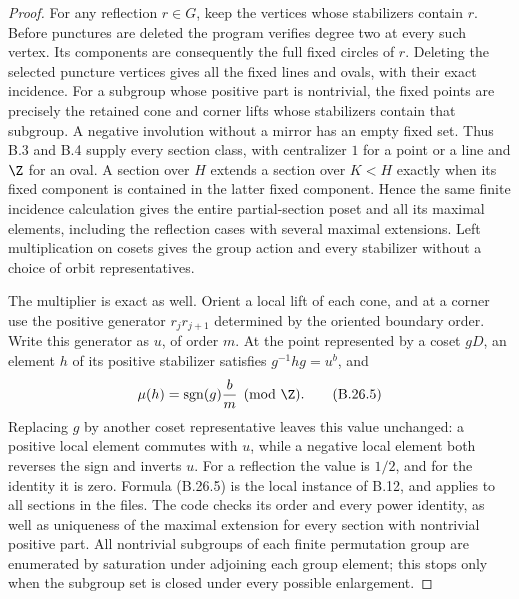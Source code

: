 \begin{proof}
For any reflection $r\in G$, keep the vertices whose stabilizers
contain $r$.  Before punctures are deleted the program verifies degree
two at every such vertex.  Its components are consequently the full
fixed circles of $r$.  Deleting the selected puncture vertices gives
all the fixed lines and ovals, with their exact incidence.  For a
subgroup whose positive part is nontrivial, the fixed points are
precisely the retained cone and corner lifts whose stabilizers contain
that subgroup.  A negative involution without a mirror has an empty
fixed set.  Thus B.3 and B.4 supply every section class, with centralizer
$1$ for a point or a line and $\Z$ for an oval.  A section over $H$
extends a section over $K<H$ exactly when its fixed component is
contained in the latter fixed component.  Hence the same finite
incidence calculation gives the entire partial-section poset and all
its maximal elements, including the reflection cases with several
maximal extensions.  Left multiplication on cosets gives the group
action and every stabilizer without a choice of orbit representatives.

The multiplier is exact as well.  Orient a local lift of each cone,
and at a corner use the positive generator $r_jr_{j+1}$ determined by
the oriented boundary order.  Write this generator as $u$, of order
$m$.  At the point represented by a coset $gD$, an element $h$ of its
positive stabilizer satisfies $g^{-1}hg=u^b$, and
\[
                   \mu(h)=\operatorname{sgn}(g)\frac bm
                                \pmod{\Z}.           \tag{B.26.5}
\]
Replacing $g$ by another coset representative leaves this value
unchanged: a positive local element commutes with $u$, while a
negative local element both reverses the sign and inverts $u$.
For a reflection the value is $1/2$, and for the identity it is zero.
Formula (B.26.5) is the local instance of B.12, and applies to all
sections in the files.  The code checks its order and every power
identity, as well as uniqueness of the maximal extension for every
section with nontrivial positive part.  All nontrivial subgroups of
each finite permutation group are enumerated by saturation under
adjoining each group element; this stops only when the subgroup set
is closed under every possible enlargement.


\end{proof}
